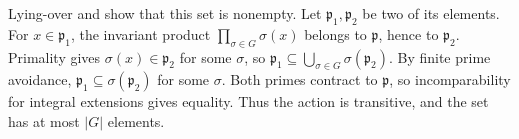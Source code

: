 Lying-over and  show that this set is nonempty. Let $\mathfrak{p}_1,\mathfrak{p}_2$ be two of its elements. For $x\in\mathfrak{p}_1$, the invariant product $\prod_{\sigma\in G}\sigma(x)$ belongs to $\mathfrak{p}$, hence to $\mathfrak{p}_2$. Primality gives $\sigma(x)\in\mathfrak{p}_2$ for some $\sigma$, so $\mathfrak{p}_1\subseteq\bigcup_{\sigma\in G}\sigma(\mathfrak{p}_2)$. By finite prime avoidance, $\mathfrak{p}_1\subseteq\sigma(\mathfrak{p}_2)$ for some $\sigma$. Both primes contract to $\mathfrak{p}$, so incomparability for integral extensions gives equality. Thus the action is transitive, and the set has at most $|G|$ elements.
